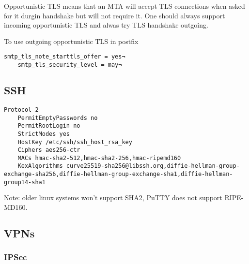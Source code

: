 
Opportunistic TLS means that an MTA will accept TLS connections when asked for it durgin handshake but will not require it. One should always support incoming opportunistic TLS and alwas try TLS handshake outgoing.


To use outgoing opportunistic TLS in postfix

\begin{lstlisting}[breaklines]
    smtp_tls_note_starttls_offer = yes¬
    smtp_tls_security_level = may¬
\end{lstlisting}



\subsection{SSH}

\begin{lstlisting}[breaklines]
	Protocol 2
	PermitEmptyPasswords no
	PermitRootLogin no
	StrictModes yes
	HostKey /etc/ssh/ssh_host_rsa_key
	Ciphers aes256-ctr
	MACs hmac-sha2-512,hmac-sha2-256,hmac-ripemd160
	KexAlgorithms curve25519-sha256@libssh.org,diffie-hellman-group-exchange-sha256,diffie-hellman-group-exchange-sha1,diffie-hellman-group14-sha1
\end{lstlisting}

Note: older linux systems won't support SHA2, PuTTY does not support RIPE-MD160.
\\


\subsection{VPNs}
\subsubsection{IPSec}

 \\
 \\
 \\

